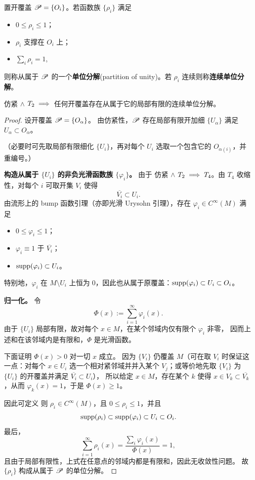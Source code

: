 \begin{definition}
    置开覆盖 $\mathscr P=\{O_i\}$。若函数族 $\{\rho_i\}$ 满足
    \begin{itemize}
        \item $0\leqslant\rho_i\leqslant 1$；
        \item $\rho_i$ 支撑在 $O_i$ 上；
        \item $\sum_i \rho_i=1$,
    \end{itemize}
    则称从属于 $\mathscr P$ 的一个\textbf{单位分解}(partition of unity)。若 $\rho_i$ 连续则称\textbf{连续单位分解}。
\end{definition}

\begin{theorem}
    仿紧 $\land$ $T_2\implies$ 任何开覆盖存在从属于它的局部有限的连续单位分解。
\end{theorem}
\begin{proof}
    设开覆盖 $\mathscr P=\{O_\alpha\}$。
    由仿紧性，$\mathscr P$ 存在局部有限开加细 $\{U_\alpha\}$ 满足 $U_\alpha\subset O_\alpha$。
    
    （必要时可先取局部有限细化 $\{U_i\}$，再对每个 $U_i$ 选取一个包含它的 $O_{\alpha(i)}$，并重编号。）

    \medskip
    \noindent\textbf{构造从属于 $\{U_i\}$ 的非负光滑函数族 $\{\varphi_i\}$。}
    由于 仿紧 $\land$ $T_2\implies T_4$。由 $T_4$ 收缩性，对每个 $i$ 可取开集 $V_i$ 使得
    \[
        \overline{V_i}\subset U_i.
    \]
    由流形上的 bump 函数引理（亦即光滑 Urysohn 引理），存在 $\varphi_i\in C^\infty(M)$ 满足
    \begin{itemize}
        \item $0\le \varphi_i\le 1$；
        \item $\varphi_i\equiv 1$ 于 $\overline{V_i}$；
        \item $\operatorname{supp}(\varphi_i)\subset U_i$。
    \end{itemize}
    特别地，$\varphi_i$ 在 $M\setminus U_i$ 上恒为 $0$，因此也从属于原覆盖：$\operatorname{supp}(\varphi_i)\subset U_i\subset O_i$。

    \medskip
    \noindent\textbf{归一化。}
    令
    \[
        \Phi(x):=\sum_{i=1}^\infty \varphi_i(x).
    \]
    由于 $\{U_i\}$ 局部有限，故对每个 $x\in M$，在某个邻域内仅有限个 $\varphi_i$ 非零，
    因而上述和在该邻域内是有限和，$\Phi$ 是光滑函数。

    下面证明 $\Phi(x)>0$ 对一切 $x$ 成立。
    因为 $\{V_i\}$ 仍覆盖 $M$（可在取 $V_i$ 时保证这一点：对每个 $x\in U_i$ 选一个相对紧邻域并并入某个 $V_j$；或等价地先取 $\{V_i\}$ 为 $\{U_i\}$ 的开覆盖并满足 $\overline{V_i}\subset U_i$），
    所以给定 $x\in M$，存在某个 $k$ 使得 $x\in V_k\subset \overline{V_k}$，从而 $\varphi_k(x)=1$，于是 $\Phi(x)\ge 1$。

    因此可定义
    则 $\rho_i\in C^\infty(M)$，且 $0\le\rho_i\le 1$，并且
    \[
        \operatorname{supp}(\rho_i)\subset \operatorname{supp}(\varphi_i)\subset U_i\subset O_i.
    \]
    最后，
    \[
        \sum_{i=1}^\infty \rho_i(x)=\frac{\sum_i\varphi_i(x)}{\Phi(x)}=1,
    \]
    且由于局部有限性，上式在任意点的邻域内都是有限和，因此无收敛性问题。
    故 $\{\rho_i\}$ 构成从属于 $\mathscr P$ 的单位分解。
\end{proof}


